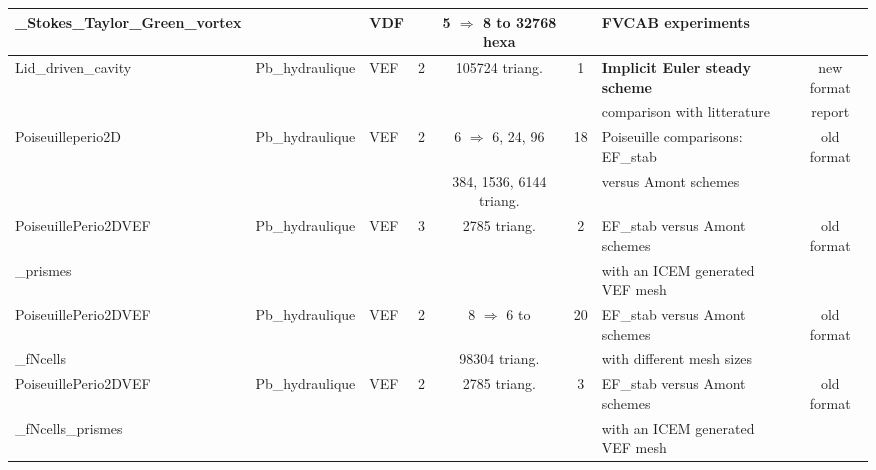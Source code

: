\begin{table}[H]
\begin{centering}
\begin{longtable}{lclccclc}
\rowcolor{LimeGreen!10}\_Stokes\_Taylor\_Green\_vortex &  & VDF &  & 5 $\Rightarrow$ 8 to 32768 hexa &  & FVCAB experiments &  \\
\hline
\rowcolor{LimeGreen!10}Lid\_driven\_cavity & Pb\_hydraulique & VEF & 2 & 105724 triang. & 1 & \textbf{Implicit Euler steady scheme} & new format \\
\rowcolor{LimeGreen!10}& & & & & & comparison with litterature & report \\
\hline
\rowcolor{LimeGreen!10}Poiseuilleperio2D & Pb\_hydraulique & VEF & 2 & 6 $\Rightarrow$ 6, 24, 96 & 18 & Poiseuille comparisons: EF\_stab & old format \\
\rowcolor{LimeGreen!10} & & & & 384, 1536, 6144 triang. & & versus Amont schemes & \\
\hline
\rowcolor{LimeGreen!10}PoiseuillePerio2DVEF & Pb\_hydraulique & VEF & 3 & 2785 triang. & 2 & EF\_stab versus Amont schemes  & old format \\
\rowcolor{LimeGreen!10}\_prismes & & & & & & with an ICEM generated VEF mesh & \\
\hline
\rowcolor{LimeGreen!10}PoiseuillePerio2DVEF & Pb\_hydraulique & VEF & 2 & 8 $\Rightarrow$ 6 to  & 20 & EF\_stab versus Amont schemes & old format \\
\rowcolor{LimeGreen!10}\_fNcells & & & & 98304 triang. & & with different mesh sizes & \\
\hline
\rowcolor{LimeGreen!10}PoiseuillePerio2DVEF & Pb\_hydraulique & VEF & 2 & 2785 triang. & 3 & EF\_stab versus Amont schemes & old format \\
\rowcolor{LimeGreen!10}\_fNcells\_prismes & & & & & & with an ICEM generated VEF mesh &  \\
\hline
\end{longtable}
\end{centering}
\end{table}

\newpage

